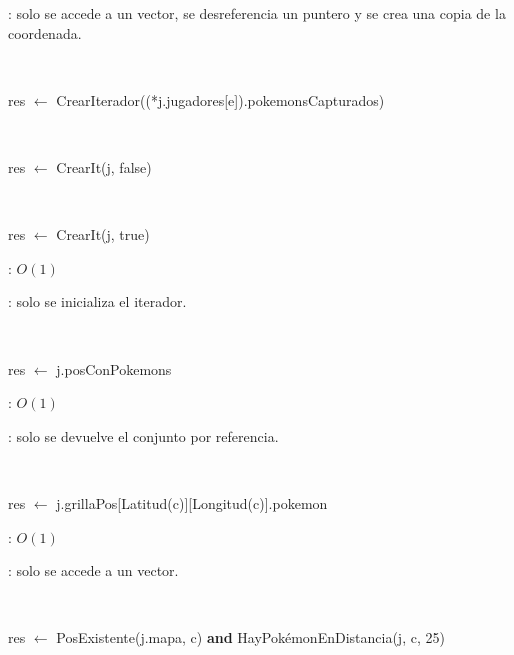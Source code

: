 \begin{Algoritmos}
	\justifcomp: solo se accede a un vector, se desreferencia un puntero y se crea una copia de la coordenada.

	~

	\begin{algorithm}[H]
		\NoCaptionOfAlgo
		\caption{}
		res $\leftarrow$ CrearIterador((*j.jugadores[e]).pokemonsCapturados)
	\end{algorithm}

	~

	\begin{algorithm}[H]
		\NoCaptionOfAlgo
		\caption{}
		res $\leftarrow$ CrearIt(j, false)
	\end{algorithm}

	~

	\begin{algorithm}[H]
		\NoCaptionOfAlgo
		\caption{}
		res $\leftarrow$ CrearIt(j, true)
	\end{algorithm}

	\complejidad: $O(1)$

	\justifcomp: solo se inicializa el iterador. 

	~

	\begin{algorithm}[H]
		\NoCaptionOfAlgo
		\caption{}
		res $\leftarrow$ j.posConPokemons
	\end{algorithm}

	\complejidad: $O(1)$

	\justifcomp: solo se devuelve el conjunto por referencia.

	~

	\begin{algorithm}[H]
		\NoCaptionOfAlgo
		\caption{}
		res $\leftarrow$ j.grillaPos[Latitud(c)][Longitud(c)].pokemon
	\end{algorithm}

	\complejidad: $O(1)$

	\justifcomp: solo se accede a un vector.

	~

	\begin{algorithm}[H]
		\NoCaptionOfAlgo
		\caption{}
		res $\leftarrow$ PosExistente(j.mapa, c) \textbf{and} HayPokémonEnDistancia(j, c, 25)
	\end{algorithm}


\end{Algoritmos}
